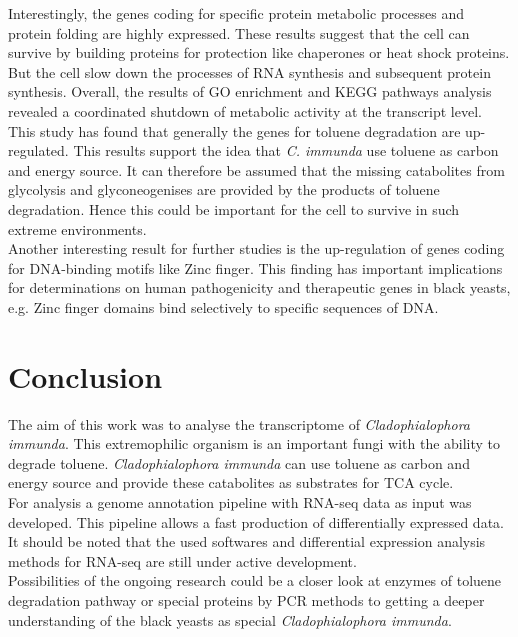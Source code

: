 \documentclass[12pt, a4paper]{report}
\begin{document}
Interestingly, the genes coding for specific protein metabolic processes and protein folding are highly expressed. These results suggest that the cell can survive by building proteins for protection like chaperones or heat shock proteins. But the cell slow down the processes of RNA synthesis and subsequent protein synthesis. Overall, the results of GO enrichment and KEGG pathways analysis revealed a coordinated shutdown of metabolic activity at the transcript level. \\

This study has found that generally the genes for toluene degradation are up-regulated. This results support the idea that \textit{C. immunda} use toluene as carbon and energy source. It can therefore be assumed that the missing catabolites from glycolysis and glyconeogenises are provided by the products of toluene degradation. Hence this could be important for the cell to survive in such extreme environments. \\

Another interesting result for further studies is the up-regulation of genes coding for DNA-binding motifs like Zinc finger. This finding has important implications for determinations on human pathogenicity and therapeutic genes in black yeasts, e.g. Zinc finger domains bind selectively to specific sequences of DNA. \\


\newpage
\chapter*{Conclusion}
The aim of this work was to analyse the transcriptome of \textit{Cladophialophora immunda}. This extremophilic organism is an important fungi with the ability to degrade toluene. \textit{Cladophialophora immunda} can use toluene as carbon and energy source  and provide these catabolites as substrates for TCA cycle. \\

For analysis a genome annotation pipeline with RNA-seq data as input was developed. This pipeline allows a fast production of differentially expressed data. It should be noted that the used softwares and differential expression analysis methods for RNA-seq are still under active development. \\
 
Possibilities of the ongoing research could be a closer look at enzymes of toluene degradation pathway or special proteins by PCR methods to getting a deeper understanding of the black yeasts as special \textit{Cladophialophora immunda}.\\
 
\end{document}
